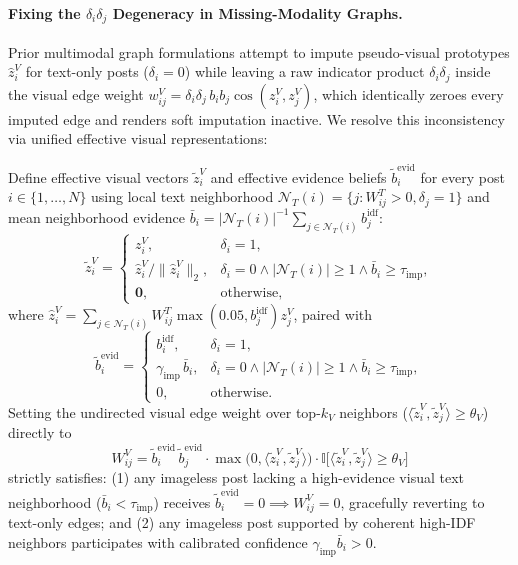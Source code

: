 \paragraph{Fixing the $\delta_i \delta_j$ Degeneracy in Missing-Modality Graphs.}
Prior multimodal graph formulations attempt to impute pseudo-visual prototypes $\hat{z}_i^V$ for text-only posts ($\delta_i = 0$) while leaving a raw indicator product $\delta_i \delta_j$ inside the visual edge weight $w_{ij}^V = \delta_i \delta_j \, b_i b_j \cos(z_i^V, z_j^V)$, which identically zeroes every imputed edge and renders soft imputation inactive. We resolve this inconsistency via unified effective visual representations:

\begin{proposition}
\label{prop:soft_impute}
Define effective visual vectors $\tilde{z}_i^V$ and effective evidence beliefs $\tilde{b}_i^{\text{evid}}$ for every post $i \in \{1,\dots,N\}$ using local text neighborhood $\mathcal{N}_T(i) = \{j : W^T_{ij} > 0, \delta_j = 1\}$ and mean neighborhood evidence $\bar{b}_i = |\mathcal{N}_T(i)|^{-1} \sum_{j \in \mathcal{N}_T(i)} b_j^{\text{idf}}$:
\begin{equation}
\label{eq:soft_impute}
\tilde{z}_i^V =
\begin{cases}
z_i^V, & \delta_i = 1, \\
\hat{z}_i^V / \|\hat{z}_i^V\|_2, & \delta_i = 0 \wedge |\mathcal{N}_T(i)| \ge 1 \wedge \bar{b}_i \ge \tau_{\text{imp}}, \\
\mathbf{0}, & \text{otherwise},
\end{cases}
\end{equation}
where $\hat{z}_i^V = \sum_{j \in \mathcal{N}_T(i)} W^T_{ij} \max(0.05, b_j^{\text{idf}}) z_j^V$, paired with
\begin{equation}
\label{eq:soft_b}
\tilde{b}_i^{\text{evid}} =
\begin{cases}
b_i^{\text{idf}}, & \delta_i = 1, \\
\gamma_{\text{imp}} \, \bar{b}_i, & \delta_i = 0 \wedge |\mathcal{N}_T(i)| \ge 1 \wedge \bar{b}_i \ge \tau_{\text{imp}}, \\
0, & \text{otherwise}.
\end{cases}
\end{equation}
Setting the undirected visual edge weight over top-$k_V$ neighbors ($\langle \tilde{z}_i^V, \tilde{z}_j^V \rangle \ge \theta_V$) directly to
\begin{equation}
\label{eq:vis_edge}
W_{ij}^V = \tilde{b}_i^{\text{evid}} \, \tilde{b}_j^{\text{evid}} \cdot \max\!\big(0, \langle \tilde{z}_i^V, \tilde{z}_j^V \rangle\big) \cdot \mathbb{I}\!\big[\langle \tilde{z}_i^V, \tilde{z}_j^V \rangle \ge \theta_V\big]
\end{equation}
strictly satisfies: (1) any imageless post lacking a high-evidence visual text neighborhood ($\bar{b}_i < \tau_{\text{imp}}$) receives $\tilde{b}_i^{\text{evid}} = 0 \implies W_{ij}^V = 0$, gracefully reverting to text-only edges; and (2) any imageless post supported by coherent high-IDF neighbors participates with calibrated confidence $\gamma_{\text{imp}} \bar{b}_i > 0$.
\end{proposition}

